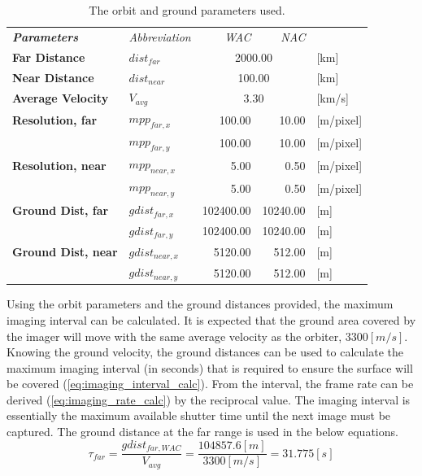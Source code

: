 \begin{table}[h!]
  \centering
    \begin{tabular}{l|l|r|r|l}
\textit{\textbf{Parameters}} & \textit{Abbreviation} & \multicolumn{1}{r}{\textit{WAC}} & \multicolumn{1}{r}{\textit{NAC}} &  \bigstrut[b]\\
\cline{1-4}\textbf{Far Distance} & $dist_{far}$ & \multicolumn{2}{c|}{2000.00} & [km] \bigstrut[t]\\
\textbf{Near Distance} & $dist_{near}$ & \multicolumn{2}{c|}{100.00} & [km] \\
\textbf{Average Velocity} & $V_{avg}$ & \multicolumn{2}{c|}{3.30} & [km/s] \bigstrut[b]\\
\cline{1-4}\textbf{Resolution, far} & $mpp_{far,x}$ & 100.00 & 10.00 & [m/pixel] \bigstrut[t]\\
      & $mpp_{far,y}$ & 100.00 & 10.00 & [m/pixel] \bigstrut[b]\\
\cline{2-4}\textbf{Resolution, near} & $mpp_{near,x}$ & 5.00  & 0.50  & [m/pixel] \bigstrut[t]\\
      & $mpp_{near,y}$ & 5.00  & 0.50  & [m/pixel] \bigstrut[b]\\
\cline{1-4}\textbf{Ground Dist, far} & $gdist_{far,x}$ & 102400.00 & 10240.00 & [m] \bigstrut[t]\\
      & $gdist_{far,y}$ & 102400.00 & 10240.00 & [m] \bigstrut[b]\\
\cline{2-4}\textbf{Ground Dist, near} & $gdist_{near,x}$ & 5120.00 & 512.00 & [m] \bigstrut[t]\\
      & $gdist_{near,y}$ & 5120.00 & 512.00 & [m] \\
\end{tabular}%
  \caption{The orbit and ground parameters used.}
  \label{tab:imaging_parameters}%
\end{table}%
Using the orbit parameters and the ground distances provided, the maximum imaging interval can be calculated. It is expected that the ground area covered by the imager will move with the same average velocity as the orbiter, $3300 [m/s]$. Knowing the ground velocity, the ground distances can be used to calculate the maximum imaging interval (in seconds) that is required to ensure the surface will be covered (\ref{eq:imaging_interval_calc}). From the interval, the frame rate can be derived (\ref{eq:imaging_rate_calc}) by the reciprocal value. The imaging interval is essentially the maximum available shutter time until the next image must be captured. The ground distance at the far range is used in the below equations.
\begin{equation}\label{eq:imaging_interval_calc}
\tau_{far} = \frac{gdist_{far,WAC}}{V_{avg}} = \frac{104857.6[m]}{3300[m/s]} = 31.775 [s]
\end{equation}
